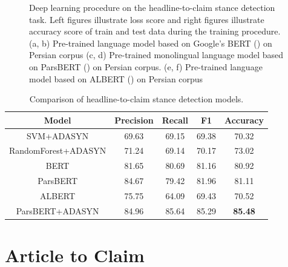 \begin{figure}
	\qquad
	
	
	\caption{Deep learning procedure on the headline-to-claim stance detection task. Left figures illustrate loss score and right figures illustrate accuracy score of train and test data during the training procedure. (a, b) Pre-trained language model based on Google's BERT (\cite{parsbert}) on Persian corpus (c, d) Pre-trained monolingual language model based on ParsBERT (\cite{parsbert}) on Persian corpus. (e, f) Pre-trained language model based on ALBERT (\cite{albert}) on Persian corpus}%
	\label{fig:deep}%
\end{figure}

\begin{table}[t]
	\centering
	\small
	\caption{Comparison of headline-to-claim stance detection models.}
	\def\arraystretch{1.3}%
	\setlength{\extrarowheight}{5pt}%
	\begin{tabular}{|c|c|c|c|c|}
		\hline{Model} & {Precision} & {Recall} & {F1} & {Accuracy}\\
		\hline \hline
		{SVM+ADASYN} & {69.63} & {69.15} & {69.38} & {70.32}\\
		\hline
		{RandomForest+ADASYN} & {71.24} & {69.14} & {70.17} & {73.02}\\
		\hline
		{BERT} & {81.65} & {80.69} & {81.16} & {80.92}\\
		\hline
		{ParsBERT} & {84.67} & {79.42} & {81.96} & {81.11}\\
		\hline
		{ALBERT} & {75.75} & {64.09} & {69.43} & {70.52}\\
		\hline
		{ParsBERT+ADASYN} & {84.96} & {85.64} & {85.29} & {\textbf{85.48}}\\
		\hline
	\end{tabular}
	\label{tbl:allstance}
\end{table}


\section{Article to Claim}

